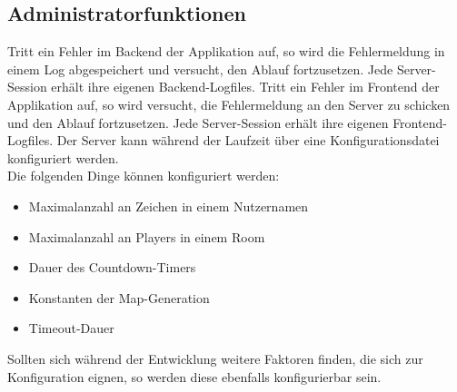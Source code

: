 \subsection{Administratorfunktionen}
\begin{description}
		Tritt ein Fehler im Backend der Applikation auf, so wird die Fehlermeldung in einem Log abgespeichert und versucht, den Ablauf fortzusetzen. Jede Server-Session erhält ihre eigenen Backend-Logfiles.
		Tritt ein Fehler im Frontend der Applikation auf, so wird versucht, die Fehlermeldung an den Server zu schicken und den Ablauf fortzusetzen. Jede Server-Session erhält ihre eigenen Frontend-Logfiles.
		Der Server kann während der Laufzeit über eine Konfigurationsdatei konfiguriert werden. \\
		Die folgenden Dinge können konfiguriert werden:
		\begin{itemize}
			\item Maximalanzahl an Zeichen in einem Nutzernamen
			\item Maximalanzahl an Players in einem Room
			\item Dauer des Countdown-Timers
			\item Konstanten der Map-Generation
			\item Timeout-Dauer
		\end{itemize}
		Sollten sich während der Entwicklung weitere Faktoren finden, die sich zur Konfiguration eignen, so werden diese ebenfalls konfigurierbar sein.
\end{description}